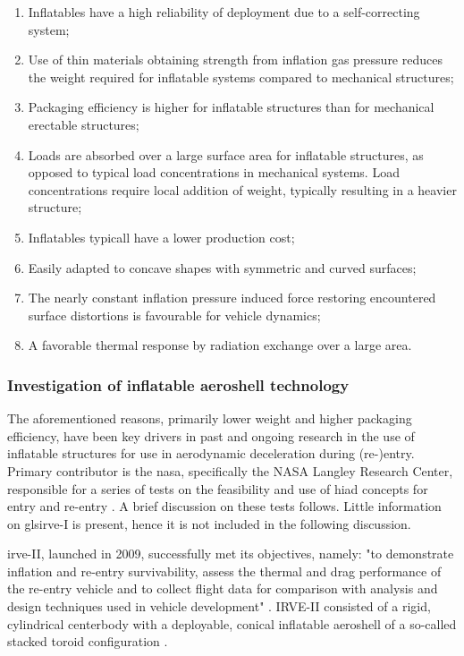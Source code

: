 \begin{enumerate}
\item Inflatables have a high reliability of deployment due to a self-correcting system;
\item Use of thin materials obtaining strength from inflation gas pressure reduces the weight required for inflatable systems compared to mechanical structures;
\item Packaging efficiency is higher for inflatable structures than for mechanical erectable structures;
\item Loads are absorbed over a large surface area for inflatable structures, as opposed to typical load concentrations in mechanical systems. Load concentrations require local addition of weight, typically resulting in a heavier structure;
\item Inflatables typicall have a lower production cost;
\item Easily adapted to concave shapes with symmetric and curved surfaces;
\item The nearly constant inflation pressure induced force restoring encountered surface distortions is favourable for vehicle dynamics;
\item A favorable thermal response by radiation exchange over a large area.
\end{enumerate}

\subsubsection{Investigation of inflatable aeroshell technology}
The aforementioned reasons, primarily lower weight and higher packaging efficiency, have been key drivers in past and ongoing research in the use of inflatable structures for use in aerodynamic deceleration during (re-)entry. Primary contributor is the \gls{nasa}, specifically the NASA Langley Research Center, responsible for a series of tests on the feasibility and use of \gls{hiad} concepts for entry and re-entry \cite{Hughes2005, Dillman2010, Dillman2012, Dillman2014}. A brief discussion on these tests follows. Little information on gls{irve}-I \cite{Hughes2005} is present, hence it is not included in the following discussion.  

\gls{irve}-II, launched in 2009, successfully met its objectives, namely: "to demonstrate inflation and re-entry survivability, assess the thermal and drag performance of the re-entry vehicle and to collect flight data for comparison with analysis and design techniques used in vehicle development" \cite[p.1]{Dillman2010}. IRVE-II consisted of a rigid, cylindrical centerbody with a deployable, conical inflatable aeroshell of a so-called stacked toroid configuration \cite{Smith2010,Bose2009}.

